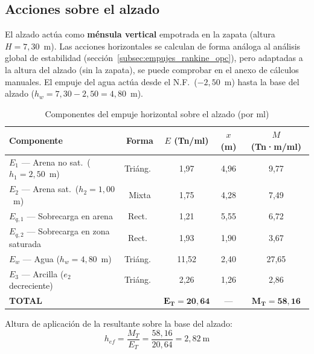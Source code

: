 \subsection{Acciones sobre el alzado}
\label{subsec:acciones_fuste}

El alzado actúa como \textbf{ménsula vertical} empotrada en la zapata
(altura $H = 7{,}30$~m). Las acciones horizontales se calculan de forma
análoga al análisis global de estabilidad
(sección~\ref{subsec:empujes_rankine_opc}), pero adaptadas a la
altura del alzado (sin la zapata), se puede comprobar en el anexo de cálculos manuales.
El empuje del agua actúa desde el N.F.\ ($-2{,}50$~m) hasta la base del
alzado ($h_w = 7{,}30 - 2{,}50 = 4{,}80$~m).

\begin{table}[H]
  \centering
  \caption{Componentes del empuje horizontal sobre el alzado (por ml)}
  \label{tab:empuje_fuste}
  \begin{tabular}{@{}lcccc@{}}
    \toprule
    \textbf{Componente} & \textbf{Forma}
    & $E$ \textbf{(Tn/ml)} & $x$ \textbf{(m)} & $M$ \textbf{(Tn·m/ml)} \\
    \midrule
    $E_1$ — Arena no sat.\ ($h_1=2{,}50$~m) & Triáng.\ & 1{,}97 & 4{,}96 &  9{,}77 \\
    $E_2$ — Arena sat.\  ($h_2=1{,}00$~m)  & Mixta     & 1{,}75 & 4{,}28 &  7{,}49 \\
    $E_{q,1}$ — Sobrecarga en arena         & Rect.\    & 1{,}21 & 5{,}55 &  6{,}72 \\
    $E_{q,2}$ — Sobrecarga en zona saturada & Rect.\    & 1{,}93 & 1{,}90 &  3{,}67 \\
    $E_w$ — Agua ($h_w=4{,}80$~m)           & Triáng.\  & 11{,}52 & 2{,}40 & 27{,}65 \\
    $E_3$ — Arcilla ($e_2$ decreciente)     & Triáng.\  &  2{,}26 & 1{,}26 &  2{,}86 \\
    \midrule
    \textbf{TOTAL} & & $\mathbf{E_T = 20{,}64}$ & — & $\mathbf{M_T = 58{,}16}$ \\
    \bottomrule
  \end{tabular}
\end{table}

Altura de aplicación de la resultante sobre la base del alzado:
\[
  h_{ef} = \frac{M_T}{E_T} = \frac{58{,}16}{20{,}64} = 2{,}82~\text{m}
\]

